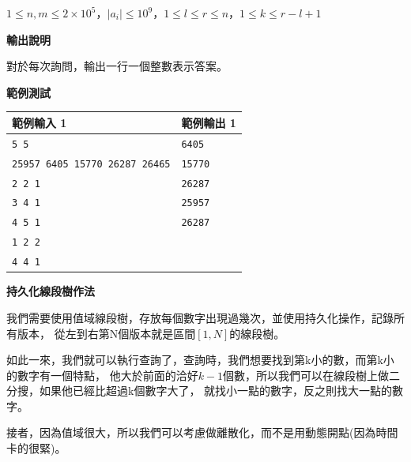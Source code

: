     $1 \leq n,m \leq 2\times 10^5$，$|a_i| \leq 10^9$，$1 \leq l \leq r \leq n$，$1 \leq k \leq r - l + 1$

    \textbf{輸出說明}

    對於每次詢問，輸出一行一個整數表示答案。

    \textbf{範例測試}

    \begin{tabular}{|m{7cm}|m{7cm}|}
        \hline
        範例輸入 1 & 範例輸出 1 \\
        \hline
        \verb|5 5|  & \verb|6405| \\
        \verb|25957 6405 15770 26287 26465|  & \verb|15770| \\
        \verb|2 2 1|  & \verb|26287| \\
        \verb|3 4 1|  & \verb|25957| \\
        \verb|4 5 1|  & \verb|26287| \\
        \verb|1 2 2|  & \\
        \verb|4 4 1|  & \\
        \hline
    \end{tabular}

    \textbf{持久化線段樹作法}

    我們需要使用值域線段樹，存放每個數字出現過幾次，並使用持久化操作，記錄所有版本，
    從左到右第N個版本就是區間$[1,N]$的線段樹。

    如此一來，我們就可以執行查詢了，查詢時，我們想要找到第k小的數，而第k小的數字有一個特點，
    他大於前面的洽好$k-1$個數，所以我們可以在線段樹上做二分搜，如果他已經比超過k個數字大了，
    就找小一點的數字，反之則找大一點的數字。

    接者，因為值域很大，所以我們可以考慮做離散化，而不是用動態開點(因為時間卡的很緊)。

